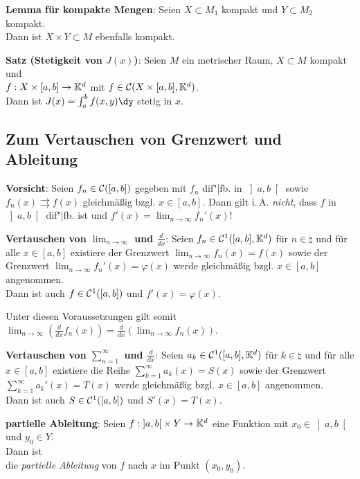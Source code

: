 \textbf{Lemma für kompakte Mengen}:
Seien $X \subset M_1$ kompakt und $Y \subset M_2$ kompakt. \\
Dann ist $X \times Y \subset M$ ebenfalls kompakt.

\linie

\textbf{Satz (Stetigkeit von $J(x)$)}:
Seien $M$ ein metrischer Raum, $X \subset M$ kompakt und \\
$f: X \times [a,b] \rightarrow \mathbb{K}^d$ mit
$f \in \mathcal{C}(X \times [a,b], \mathbb{K}^d)$. \\
Dann ist $J(x) = \int_a^b f(x, y)\dy$ stetig in $x$.

\pagebreak

\subsection{%
    Zum Vertauschen von Grenzwert und Ableitung%
}


\textbf{Vorsicht}:
Seien $f_n \in \mathcal{C}([a,b])$ gegeben mit $f_n$ dif"|fb. in $\left]a,b\right[$
sowie $f_n(x) \rightrightarrows f(x)$ gleichmäßig bzgl. $x \in [a,b]$.
Dann gilt i.\,A. \emph{nicht}, dass $f$ in $\left]a,b\right[$ dif"|fb. ist
und $f'(x) = \lim_{n \to \infty} f_n'(x)$!

\textbf{Vertauschen von $\lim_{n \to \infty}$ und $\frac{d}{dx}$}:
Seien $f_n \in \mathcal{C}^1([a,b], \mathbb{K}^d)$ für $n \in \natural$
und für alle $x \in [a,b]$ existiere der Grenzwert
$\lim_{n \to \infty} f_n(x) = f(x)$ sowie der Grenzwert
$\lim_{n \to \infty} f_n'(x) = \varphi(x)$ werde gleichmäßig bzgl.
$x \in [a,b]$ angenommen. \\
Dann ist auch $f \in \mathcal{C}^1([a,b])$ und $f'(x) = \varphi(x)$.

Unter diesen Voraussetzungen gilt somit
$\lim_{n \to \infty} \left(\frac{d}{dx} f_n(x)\right) =
\frac{d}{dx} \left(\lim_{n \to \infty} f_n(x)\right)$.

\textbf{Vertauschen von $\sum_{n=1}^\infty$ und $\frac{d}{dx}$}:
Seien $a_k \in \mathcal{C}^1([a,b], \mathbb{K}^d)$ für $k \in \natural$ und für alle \\
$x \in [a,b]$ existiere die Reihe
$\sum_{k=1}^\infty a_k(x) = S(x)$ sowie der Grenzwert
$\sum_{k=1}^\infty a_k'(x) = T(x)$ werde gleichmäßig bzgl.
$x \in [a,b]$ angenommen. \\
Dann ist auch $S \in \mathcal{C}^1([a,b])$ und $S'(x) = T(x)$.

\linie

\textbf{partielle Ableitung}:
Seien $f: \left]a,b\right[ \times Y \rightarrow \mathbb{K}^d$ eine Funktion
mit $x_0 \in \left]a,b\right[$ und $y_0 \in Y$. \\
Dann ist
 \\
die \emph{partielle Ableitung} von $f$ nach $x$ im Punkt $(x_0, y_0)$.


